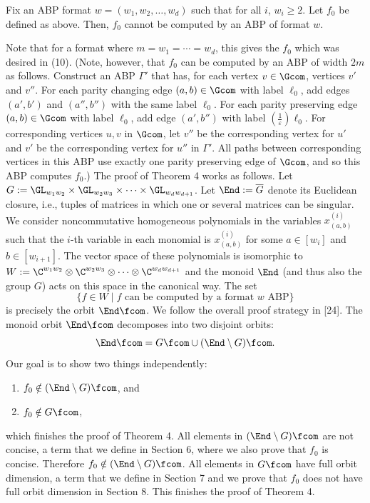 \setcounter{theorem}{3}
\begin{theorem}\label{thm:nonclosure}
Fix an ABP format $w=(w_1,w_2,\ldots,w_d)$ such that for all $i$, $w_i\ge2$. Let $f_0$ be defined as above. Then, $f_0$ cannot be computed by an ABP of format $w$.
\end{theorem}
Note that for a format where $m=w_1=\cdots=w_d$, this gives the $f_0$ which was desired in (10). (Note, however, that $f_0$ can be computed by an ABP of width $2m$ as follows. Construct an ABP $\Gamma'$ that has, for each vertex $v\in\Gcom$, vertices $v'$ and $v''$. For each parity changing edge $(a,b)\in\Gcom$ with label $\ell_0$, add edges $(a',b')$ and $(a'',b'')$ with the same label $\ell_0$. For each parity preserving edge $(a,b)\in\Gcom$ with label $\ell_0$, add edge $(a',b'')$ with label $(\frac1\varepsilon)\ell_0$. For corresponding vertices $u,v$ in $\Gcom$, let $v''$ be the corresponding vertex for $u'$ and $v'$ be the corresponding vertex for $u''$ in $\Gamma'$. All paths between corresponding vertices in this ABP use exactly one parity preserving edge of $\Gcom$, and so this ABP computes $f_0$.)
The proof of Theorem 4 works as follows. Let $G:=\GL_{w_1w_2}\times\GL_{w_2w_3}\times\cdots\times\GL_{w_dw_{d+1}}$. Let $\End:=\overline G$ denote its Euclidean closure, i.e., tuples of matrices in which one or several matrices can be singular.
We consider noncommutative homogeneous polynomials in the variables $x^{(i)}_{(a,b)}$ such that the $i$-th variable in each monomial is $x^{(i)}_{(a,b)}$ for some $a\in[w_i]$ and $b\in[w_{i+1}]$. The vector space of these polynomials is isomorphic to $W:=\C^{w_1w_2}\otimes\C^{w_2w_3}\otimes\cdots\otimes\C^{w_dw_{d+1}}$ and the monoid $\End$ (and thus also the group $G$) acts on this space in the canonical way. The set
\[\{f\in W\mid f\text{ can be computed by a format }w\text{ ABP}\}\]
is precisely the orbit $\End\fcom$. We follow the overall proof strategy in [24]. The monoid orbit $\End\fcom$ decomposes into two disjoint orbits:
\[\End\fcom=G\fcom\cup(\End\setminus G)\fcom.\]
Our goal is to show two things independently:
\begin{enumerate}\item $f_0\notin(\End\setminus G)\fcom$, and\item $f_0\notin G\fcom$,\end{enumerate}
which finishes the proof of Theorem 4.
All elements in $(\End\setminus G)\fcom$ are not concise, a term that we define in Section 6, where we also prove that $f_0$ is concise. Therefore $f_0\notin(\End\setminus G)\fcom$.
All elements in $G\fcom$ have full orbit dimension, a term that we define in Section 7 and we prove that $f_0$ does not have full orbit dimension in Section 8. This finishes the proof of Theorem 4.
